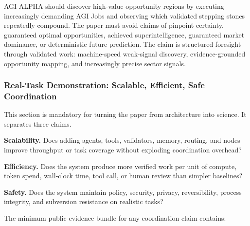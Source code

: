 AGI ALPHA should discover high-value opportunity regions by executing
increasingly demanding AGI Jobs and observing which validated stepping
stones repeatedly compound. The paper must avoid claims of pinpoint
certainty, guaranteed optimal opportunities, achieved superintelligence,
guaranteed market dominance, or deterministic future prediction. The
claim is structured foresight through validated work: machine-speed
weak-signal discovery, evidence-grounded opportunity mapping, and
increasingly precise sector signals.

\subsubsection{Real-Task Demonstration: Scalable, Efficient, Safe
Coordination}\label{real-task-demonstration-scalable-efficient-safe-coordination}

This section is mandatory for turning the paper from architecture into
science. It separates three claims.

\textbf{Scalability.} Does adding agents, tools, validators, memory,
routing, and nodes improve throughput or task coverage without exploding
coordination overhead?

\textbf{Efficiency.} Does the system produce more verified work per unit
of compute, token spend, wall-clock time, tool call, or human review
than simpler baselines?

\textbf{Safety.} Does the system maintain policy, security, privacy,
reversibility, process integrity, and subversion resistance on realistic
tasks?

The minimum public evidence bundle for any coordination claim contains:

\begin{Shaded}
\begin{Highlighting}[]
\end{Highlighting}
\end{Shaded}

